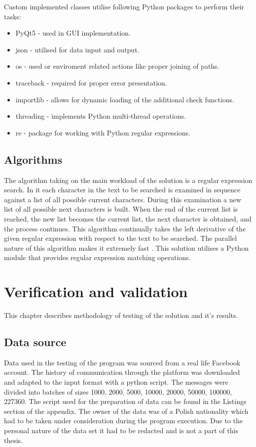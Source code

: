 \documentclass[a4paper,twoside,12pt]{book}
\begin{document}
Custom implemented classes utilise following Python packages to perform their tasks: 

\begin{itemize}
   \item PyQt5 - used in GUI implementation.
   \item json - utilised for data input and output.
   \item os - used or enviroment related actions like proper joining of paths.
   \item traceback - required for proper error presentation.
   \item importlib - allows for dynamic loading of the additional check functions.
   \item threading - implements Python multi-thread operations.
   \item re - package for working with Python regular expressions.
\end{itemize}

\section{Algorithms}

The algorithm taking on the main workload of the solution is a regular expression search. In it each character in the text to be searched is examined in sequence against a 
list of all possible current characters. During this examination a new list of all possible next characters is built. When the end of the current list is reached, the new list becomes the current list, the next 
character is obtained, and the process continues. This algorithm continually takes the left derivative of the given regular expression with respect to the text to be searched. The parallel nature of this algorithm 
makes it extremely fast \cite{bib:articleRE}. This solution utilises a Python module that provides regular expression matching operations.

\chapter{Verification and validation}

This chapter describes methodology of testing of the solution and it's results.

\section{Data source}

Data used in the testing of the program was sourced from a real life Facebook account. The history of communication through the platform was downloaded and adapted to the input format with a python script.
The messages were divided into batches of sizes 1000, 2000, 5000, 10000, 20000, 50000, 100000, 227360. The script used for the preparation of data can be found in the Listings section of the appendix.
The owner of the data was of a Polish nationality which had to be taken under consideration during the program execution. Due to the personal nature of the data set it had to be 
redacted and is not a part of this thesis.
\end{document}
